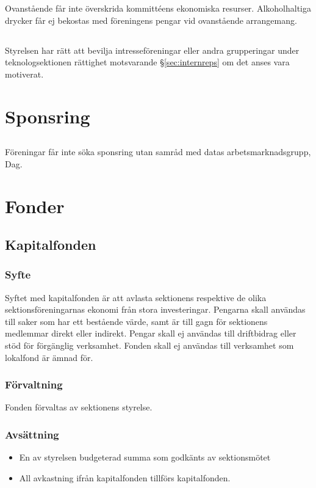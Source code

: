 \documentclass[a4paper, 10pt]{article}
\begin{document}
Ovanstående får inte överskrida kommittéens ekonomiska resurser. Alkoholhaltiga drycker får ej bekostas med föreningens pengar vid ovanstående arrangemang.

\subsection{}
Styrelsen har rätt att bevilja intresseföreningar eller andra grupperingar under teknologsektionen rättighet motsvarande §\ref{sec:internreps} om det anses vara motiverat.

\section{Sponsring}
\subsection{}
Föreningar får inte söka sponsring utan samråd med datas
arbetsmarknadsgrupp, Dag.

\section{Fonder}
\subsection{Kapitalfonden}
\subsubsection{Syfte}
\label{sec:kapitalfond_syfte}
Syftet med kapitalfonden är att avlasta sektionens respektive de olika sektionsföreningarnas ekonomi från stora investeringar. Pengarna skall användas till saker som har ett bestående värde, samt är till gagn för sektionens medlemmar direkt eller indirekt. Pengar skall ej användas till driftbidrag eller stöd för förgänglig verksamhet. Fonden skall ej användas till verksamhet som lokalfond är ämnad för.
\subsubsection{Förvaltning}
Fonden förvaltas av sektionens styrelse.
\subsubsection{Avsättning}
\begin{itemize}
\item En av styrelsen budgeterad summa som godkänts av sektionsmötet
\item All avkastning ifrån kapitalfonden tillförs kapitalfonden.
\end{itemize}
\end{document}
